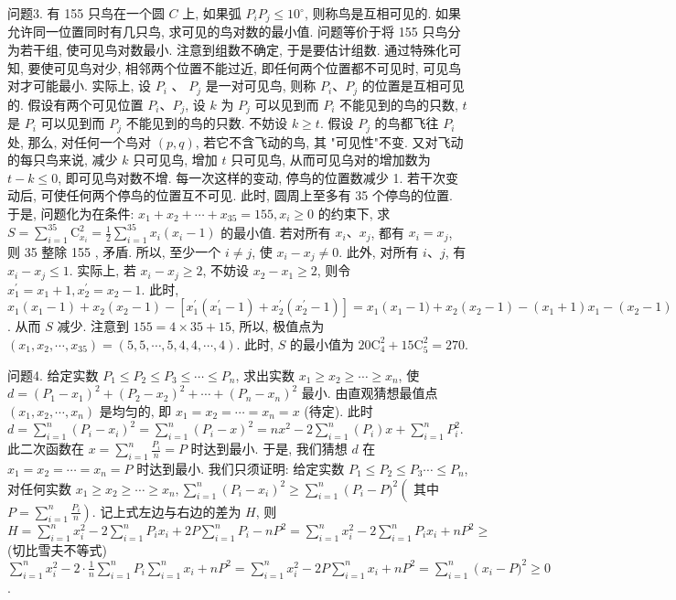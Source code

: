 问题3. 有 155 只鸟在一个圆 $C$ 上, 如果弧 $P_i P_j \leqslant 10^{\circ}$, 则称鸟是互相可见的.
如果允许同一位置同时有几只鸟, 求可见的鸟对数的最小值.
问题等价于将 155 只鸟分为若干组, 使可见鸟对数最小.
注意到组数不确定, 于是要估计组数.
通过特殊化可知, 要使可见鸟对少, 相邻两个位置不能过近, 即任何两个位置都不可见时, 可见鸟对才可能最小.
实际上, 设 $P_i$ 、 $P_j$ 是一对可见鸟, 则称 $P_i 、 P_j$ 的位置是互相可见的.
假设有两个可见位置 $P_i 、 P_j$, 设 $k$ 为 $P_j$ 可以见到而 $P_i$ 不能见到的鸟的只数, $t$ 是 $P_i$ 可以见到而 $P_j$ 不能见到的鸟的只数.
不妨设 $k \geqslant t$. 假设 $P_j$ 的鸟都飞往 $P_i$ 处, 那么, 对任何一个鸟对 $(p, q)$, 若它不含飞动的鸟, 其 "可见性"不变.
又对飞动的每只鸟来说, 减少 $k$ 只可见鸟, 增加 $t$ 只可见鸟, 从而可见乌对的增加数为 $t-k \leqslant 0$, 即可见鸟对数不增.
每一次这样的变动, 停鸟的位置数减少 1. 若干次变动后, 可使任何两个停鸟的位置互不可见.
此时, 圆周上至多有 35 个停鸟的位置.
于是, 问题化为在条件: $x_1+x_2+\cdots+x_{35}=155, x_i \geqslant 0$ 的约束下, 求 $S= \sum_{i=1}^{35} \mathrm{C}_{x_i}^2=\frac{1}{2} \sum_{i=1}^{35} x_i\left(x_i-1\right)$ 的最小值.
若对所有 $x_i 、 x_j$, 都有 $x_i=x_j$, 则 35 整除 155 , 矛盾.
所以, 至少一个 $i \neq j$, 使 $x_i-x_j \neq 0$. 此外, 对所有 $i 、 j$, 有 $x_i- x_j \leqslant 1$. 实际上, 若 $x_i-x_j \geqslant 2$, 不妨设 $x_2-x_1 \geqslant 2$, 则令 $x_1^{\prime}=x_1+1, x_2^{\prime}= x_2-1$. 此时, $x_1\left(x_1-1\right)+x_2\left(x_2-1\right)-\left[x_1^{\prime}\left(x_1^{\prime}-1\right)+x_2^{\prime}\left(x_2^{\prime}-1\right)\right]=x_1\left(x_1-\right. 1)+x_2\left(x_2-1\right)-\left(x_1+1\right) x_1-\left(x_2-1\right)\left(x_2-2\right)=-2 x_1+2\left(x_2-1\right) \geqslant 1$. 从而 $S$ 减少.
注意到 $155=4 \times 35+15$, 所以, 极值点为 $\left(x_1, x_2, \cdots, x_{35}\right)= (5,5, \cdots, 5,4,4, \cdots, 4)$. 此时, $S$ 的最小值为 $20 \mathrm{C}_4^2+15 \mathrm{C}_5^2=270$.



问题4. 给定实数 $P_1 \leqslant P_2 \leqslant P_3 \leqslant \cdots \leqslant P_n$, 求出实数 $x_1 \geqslant x_2 \geqslant \cdots \geqslant x_n$, 使 $d=\left(P_1-x_1\right)^2+\left(P_2-x_2\right)^2+\cdots+\left(P_n-x_n\right)^2$ 最小.
由直观猜想最值点 $\left(x_1, x_2, \cdots, x_n\right)$ 是均匀的, 即 $x_1=x_2=\cdots= x_n=x$ (待定). 此时 $d=\sum_{i=1}^n\left(P_i-x_i\right)^2=\sum_{i=1}^n\left(P_i-x\right)^2=n x^2-2 \sum_{i=1}^n\left(P_i\right) x+ \sum_{i=1}^n P_i^2$. 此二次函数在 $x=\sum_{i=1}^n \frac{P_i}{n}=P$ 时达到最小.
于是, 我们猜想 $d$ 在 $x_1= x_2=\cdots=x_n=P$ 时达到最小.
我们只须证明: 给定实数 $P_1 \leqslant P_2 \leqslant P_3 \cdots \leqslant P_n$, 对任何实数 $x_1 \geqslant x_2 \geqslant \cdots \geqslant x_n, \sum_{i=1}^n\left(P_i-x_i\right)^2 \geqslant \sum_{i=1}^n\left(P_i-\right. P)^2\left(\right.$ 其中 $\left.P=\sum_{i=1}^n \frac{P_i}{n}\right)$. 记上式左边与右边的差为 $H$, 则 $H=\sum_{i=1}^n x_i^2- 2 \sum_{i=1}^n P_i x_i+2 P \sum_{i=1}^n P_i-n P^2=\sum_{i=1}^n x_i^2-2 \sum_{i=1}^n P_i x_i+n P^2 \geqslant$ (切比雪夫不等式) $\sum_{i=1}^n x_i^2-2 \cdot \frac{1}{n} \sum_{i=1}^n P_i \sum_{i=1}^n x_i+n P^2=\sum_{i=1}^n x_i^2-2 P \sum_{i=1}^n x_i+n P^2=\sum_{i=1}^n\left(x_i-\right. P)^2 \geqslant 0$.



